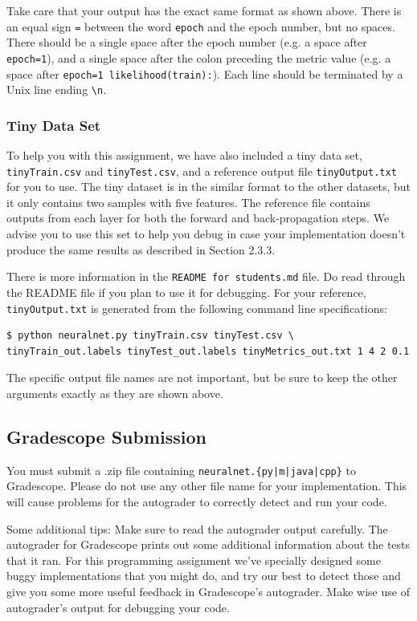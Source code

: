 \documentclass[11pt]{exam}
\numberwithin{equation}{section} %
\numberwithin{figure}{section} %
\numberwithin{table}{section} %
\begin{document}
Take care that your output has the exact same format as shown above. There is an equal sign \lstinline{=} between the word \lstinline{epoch} and the epoch number, but no spaces. There should be a single space after the epoch number (e.g. a space after \lstinline{epoch=1}), and a single space after the colon preceding the metric value (e.g. a space after \lstinline{epoch=1 likelihood(train):}). Each line should be terminated by a Unix line ending \lstinline{\n}.

\subsubsection{Tiny Data Set} \label{tiny}
To help you with this assignment, we have also included a tiny data set, \texttt{tinyTrain.csv} and \texttt{tinyTest.csv}, and a reference output file \texttt{tinyOutput.txt} for you to use. The tiny dataset is in the similar format to the other datasets, but it only contains two samples with five features. The reference file contains outputs from each layer for both the forward and back-propagation steps. We advise you to use this set to help you debug in case your implementation doesn't produce the same results as described in Section 2.3.3.

There is more information in the \texttt{README for students.md} file. Do read through the README file if you plan to use it for debugging. For your reference, \texttt{tinyOutput.txt} is generated from the following command line specifications:

\begin{lstlisting}[language=Shell]
$ python neuralnet.py tinyTrain.csv tinyTest.csv \
tinyTrain_out.labels tinyTest_out.labels tinyMetrics_out.txt 1 4 2 0.1
\end{lstlisting}
The specific output file names are not important, but be sure to keep the other arguments exactly as they are shown above.

\subsection{Gradescope Submission}
You must submit a .zip file containing \texttt{neuralnet.\{py|m|java|cpp\}} to Gradescope. Please do not use any other file name for your implementation. This will cause problems for the autograder to correctly detect and run your code.

Some additional tips: Make sure to read the autograder output carefully. The autograder for Gradescope prints out some additional 
information about the tests that it ran. For this programming assignment we've specially designed some buggy implementations that you might do, and try our best to detect those and give you some more useful feedback in Gradescope's autograder. Make wise use of autograder's output for debugging your code.
\end{document}
